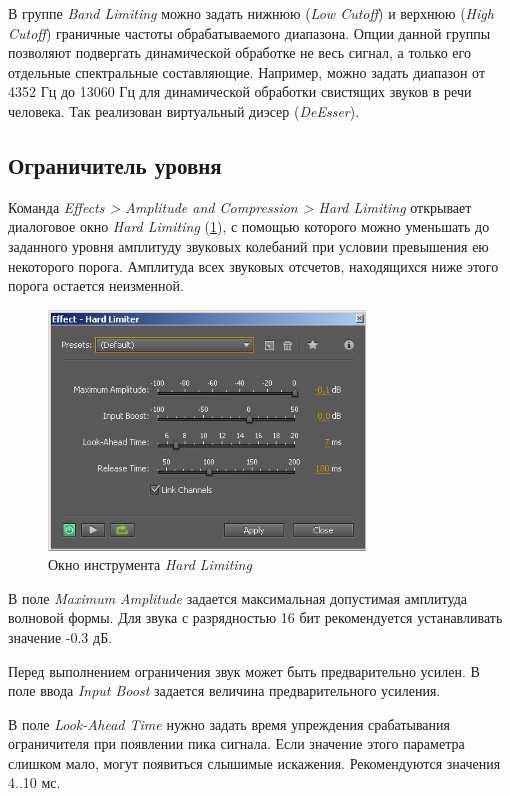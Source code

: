 \documentclass[oneside, final, 14pt]{extreport}
\begin{document}
В группе \emph{Band Limiting} можно задать нижнюю (\emph{Low Cutoff}) и верхнюю (\emph{High Cutoff}) граничные частоты обрабатываемого диапазона. Опции данной группы позволяют подвергать динамической обработке не весь сигнал, а только его отдельные спектральные составляющие. Например, можно задать диапазон от 4352 Гц до 13060 Гц для динамической обработки свистящих звуков в речи человека. Так реализован виртуальный диэсер (\emph{DeEsser}).

\subsection{Ограничитель уровня}
Команда \emph{Effects > Amplitude and Compression > Hard Limiting} открывает диалоговое окно \emph{Hard Limiting} (\ref{pic-limiterau-01}), с помощью которого можно уменьшать до заданного уровня амплитуду звуковых колебаний при условии превышения ею некоторого порога. Амплитуда всех звуковых отсчетов, находящихся ниже этого порога остается неизменной.

\begin{figure}[h!]
  \centering
  \includegraphics[width=0.75\textwidth]{pic-limiterau-01}
  \caption{Окно инструмента \emph{Hard Limiting}}
  \label{pic-limiterau-01}
\end{figure}

В поле \emph{Maximum Amplitude} задается максимальная допустимая амплитуда волновой формы. Для звука с разрядностью 16 бит рекомендуется устанавливать значение -0.3 дБ.

Перед выполнением ограничения звук может быть предварительно усилен. В поле ввода \emph{Input Boost} задается величина предварительного усиления.

В поле \emph{Look-Ahead Time} нужно задать время упреждения срабатывания ограничителя при появлении пика сигнала. Если значение этого параметра слишком мало, могут появиться слышимые искажения. Рекомендуются значения 4..10 мс.
\end{document}
